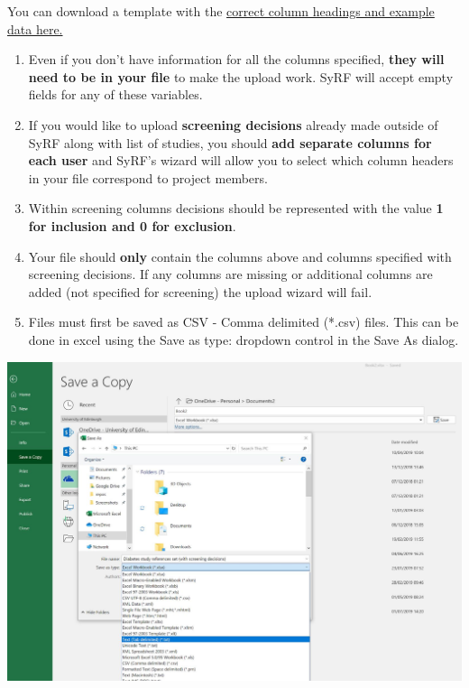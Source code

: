 \documentclass[
]{book}
\providecommand{\tightlist}{%
  \setlength{\itemsep}{0pt}\setlength{\parskip}{0pt}}
\begin{document}
You can download a template with the \href{https://syrf-test.co.uk/assets/pdfs/Systematic_search_instructions.html}{correct column headings and example data here.}

\begin{enumerate}
\def\labelenumi{\arabic{enumi}.}
\setcounter{enumi}{2}
\tightlist
\item
  Even if you don't have information for all the columns specified, \textbf{they will need to be in your file} to make the upload work. SyRF will accept empty fields for any of these variables.
\item
  If you would like to upload \textbf{screening decisions} already made outside of SyRF along with list of studies, you should \textbf{add separate columns for each user} and SyRF's wizard will allow you to select which column headers in your file correspond to project members.
\item
  Within screening columns decisions should be represented with the value \textbf{1 for inclusion and 0 for exclusion}.
\item
  Your file should \textbf{only} contain the columns above and columns specified with screening decisions. If any columns are missing or additional columns are added (not specified for screening) the upload wizard will fail.
\item
  Files must first be saved as CSV - Comma delimited (*.csv) files. This can be done in excel using the Save as type: dropdown control in the Save As dialog.
\end{enumerate}

\includegraphics[width=1\textwidth,height=1\textheight]{figs/save_csv.png}
\end{document}
